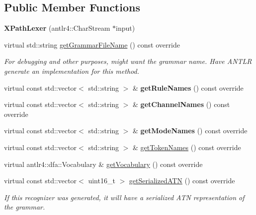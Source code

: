 \subsection*{Public Member Functions}
\begin{DoxyCompactItemize}
\item 
\mbox{\label{classXPathLexer_a86da2f3416d5f572235c249863610c8b}} 
{\bfseries X\+Path\+Lexer} (antlr4\+::\+Char\+Stream $\ast$input)
\item 
virtual std\+::string \hyperlink{classXPathLexer_aa212943fac87921b6793fda3b6dae10f}{get\+Grammar\+File\+Name} () const override
\begin{DoxyCompactList}\small\item\em For debugging and other purposes, might want the grammar name. Have A\+N\+T\+LR generate an implementation for this method. \end{DoxyCompactList}\item 
\mbox{\label{classXPathLexer_a0e6dcedfc42e02c2cf3f0d40ed5ea5a3}} 
virtual const std\+::vector$<$ std\+::string $>$ \& {\bfseries get\+Rule\+Names} () const override
\item 
\mbox{\label{classXPathLexer_a38173fc37660e52b56a052adc21a9496}} 
virtual const std\+::vector$<$ std\+::string $>$ \& {\bfseries get\+Channel\+Names} () const override
\item 
\mbox{\label{classXPathLexer_a2901d6cf7543e6b0a7336f962b042af8}} 
virtual const std\+::vector$<$ std\+::string $>$ \& {\bfseries get\+Mode\+Names} () const override
\item 
virtual const std\+::vector$<$ std\+::string $>$ \& \hyperlink{classXPathLexer_a6d2373c466f6a3d92ced0a2d79380a0d}{get\+Token\+Names} () const override
\item 
virtual antlr4\+::dfa\+::\+Vocabulary \& \hyperlink{classXPathLexer_acf45ddece8356cd0fcaa1189687c1f64}{get\+Vocabulary} () const override
\item 
virtual const std\+::vector$<$ uint16\+\_\+t $>$ \hyperlink{classXPathLexer_a59ee9cba029ff18c8468321b75da8f66}{get\+Serialized\+A\+TN} () const override
\begin{DoxyCompactList}\small\item\em If this recognizer was generated, it will have a serialized A\+TN representation of the grammar. 


\end{DoxyCompactList}
\end{DoxyCompactItemize}
